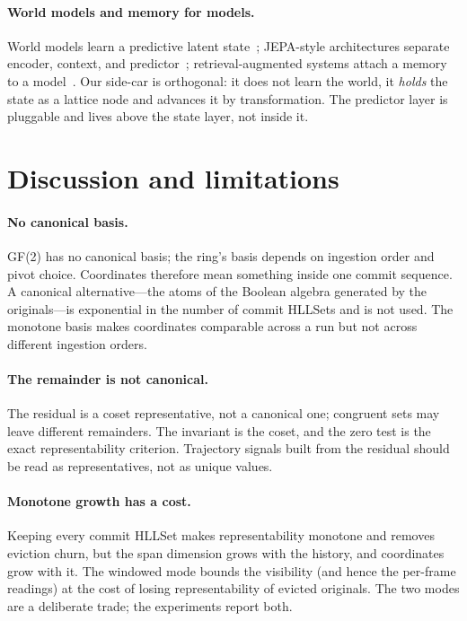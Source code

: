 \documentclass[11pt,a4paper]{article}
\theoremstyle{remark}
\begin{document}
\paragraph{World models and memory for models.} World models learn a predictive
latent state~\cite{ha2018}; JEPA-style architectures separate encoder, context,
and predictor~\cite{lecun2022}; retrieval-augmented systems attach a memory to
a model~\cite{lewis2020}. Our side-car is orthogonal: it does not learn the
world, it \emph{holds} the state as a lattice node and advances it by
transformation. The predictor layer is pluggable and lives above the state
layer, not inside it.

\section{Discussion and limitations}
\label{sec:discussion}

\paragraph{No canonical basis.} GF(2) has no canonical basis; the ring's basis
depends on ingestion order and pivot choice. Coordinates therefore mean
something inside one commit sequence. A canonical alternative---the atoms of
the Boolean algebra generated by the originals---is exponential in the number
of commit HLLSets and is not used. The monotone basis makes coordinates comparable
across a run but not across different ingestion orders.

\paragraph{The remainder is not canonical.} The residual is a coset
representative, not a canonical one; congruent sets may leave different
remainders. The invariant is the coset, and the zero test is the exact
representability criterion. Trajectory signals built from the residual should be
read as representatives, not as unique values.

\paragraph{Monotone growth has a cost.} Keeping every commit HLLSet makes
representability monotone and removes eviction churn, but the span dimension
grows with the history, and coordinates grow with it. The windowed mode bounds
the visibility (and hence the per-frame readings) at the cost of losing
representability of evicted originals. The two modes are a deliberate trade;
the experiments report both.
\end{document}

